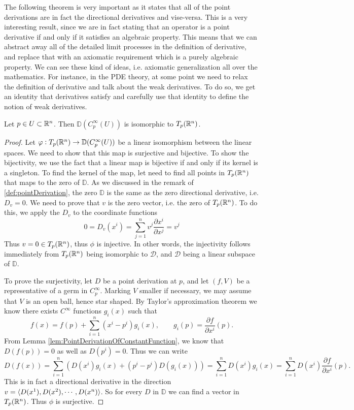 The following theorem is very important as it states that all of the point derivations are in fact the directional derivatives and vise-versa. This is a very interesting result, since we are in fact stating that an operator is a point derivative if and only if it satisfies an algebraic property. This means that we can abstract away all of the detailed limit processes in the definition of derivative, and replace that with an axiomatic requirement which is a purely algebraic property. We can see these kind of ideas, i.e. axiomatic generalization all over the mathematics. For instance, in the PDE theory, at some point we need to relax the definition of derivative and talk about the weak derivatives. To do so, we get an identity that derivatives satisfy and carefully use that identity to define the notion of weak derivatives. 

\begin{theorem}
	Let $ p \in U \subset \mathbb{R}^n $. Then $ \mathbb{D}(C_p^\infty(U)) $ is isomorphic to $ T_p(\mathbb{R}^n) $.
\end{theorem}

\begin{proof}
	Let $ \varphi : T_p(\mathbb{R}^n) \to \mathbb{D}(C_p^\infty(U))  $ be a linear isomorphism between the linear spaces. We need to show that this map is surjective and bijective. To show the bijectivity, we use the fact that a linear map is bijective if and only if its kernel is a singleton. To find the kernel of the map, let need to find all points in $ T_p(\mathbb{R}^n) $ that maps to the zero of $ \mathbb{D} $. As we discussed in the remark of \autoref{def:pointDerivation}, the zero $ \mathbb{D} $ is the same as the zero directional derivative, i.e. $ D_v = 0 $. We need to prove that $ v $ is the zero vector, i.e. the zero of $ T_p(\mathbb{R}^n) $. To do this, we apply the $ D_v $ to the coordinate functions
	\[ 0 = D_v(x^i) = \sum_{j=1}^n v^j \frac{\partial x^i}{\partial x^j} = v^j\]
	Thus $ v = 0 \in T_p(\mathbb{R}^n) $, thus $ \phi $ is injective. In other words, the injectivity follows immediately from $ T_p(\mathbb{R}^n) $ being isomorphic to $  \mathcal{D} $, and $  \mathcal{D} $ being a linear subspace of $ \mathbb{D} $.
	
	To prove the surjectivity, let $ D $ be a point derivation at $ p $, and let $ (f,V) $ be a representative of a germ in $ C_p^\infty $. Marking $ V $ smaller if necessary, we may assume that $ V $ is an open ball, hence star shaped. By Taylor's approximation theorem we know there exists $ C^\infty $ functions $ g_i(x) $ such that
	\[ f(x) = f(p) + \sum_{i=1}^{n} (x^i-p^i)g_i(x),\qquad g_i(p) = \frac{\partial f}{\partial x^i}(p). \]
	From Lemma \autoref{lem:PointDerivationOfConstantFunction}, we know that $ D(f(p)) = 0$ as well as $ D(p^i) = 0 $. Thus we can write
	\[ D(f(x)) = \sum_{i=1}^{n}(D(x^i)g_i(x) + (p^i - p^i)D(g_i(x))) =  \sum_{i=1}^{n}D(x^i)g_i(x) = \sum_{i=1}^{n}D(x^i)\frac{\partial f}{\partial x^i}(p). \]
	This is in fact a directional derivative in the direction $ v = \langle D(x^1), D(x^2), \cdots, D(x^n) \rangle $. So for every $ D $ in $ \mathbb{D} $ we can find a vector in $ T_p(\mathbb{R}^n) $. Thus $ \phi $ is surjective.
\end{proof}

